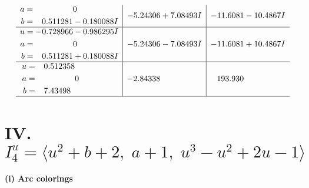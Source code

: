\documentclass[1p]{elsarticle_modified}
\theoremstyle{definition}
\begin{document}
$$\begin{array}{c|c|c}
\begin{aligned}
a &= \phantom{-0.000000 } 0 \\
b &= \phantom{-}0.511281 - 0.180088 I\end{aligned}
 & -5.24306 + 7.08493 I & -11.6081 - 10.4867 I \\ \hline\begin{aligned}
u &= -0.728966 - 0.986295 I \\
a &= \phantom{-0.000000 } 0 \\
b &= \phantom{-}0.511281 + 0.180088 I\end{aligned}
 & -5.24306 - 7.08493 I & -11.6081 + 10.4867 I \\ \hline\begin{aligned}
u &= \phantom{-}0.512358\phantom{ +0.000000I} \\
a &= \phantom{-0.000000 } 0 \\
b &= \phantom{-}7.43498\phantom{ +0.000000I}\end{aligned}
 & -2.84338\phantom{ +0.000000I} & \phantom{-}193.930\phantom{ +0.000000I}\\
 \hline 
 \end{array}$$\newpage\newpage\renewcommand{\arraystretch}{1}
\centering \section*{IV. $I^u_{4}= \langle u^2+b+2,\;a+1,\;u^3- u^2+2 u-1 \rangle$}
\flushleft \textbf{(i) Arc colorings}\\
\end{document}
